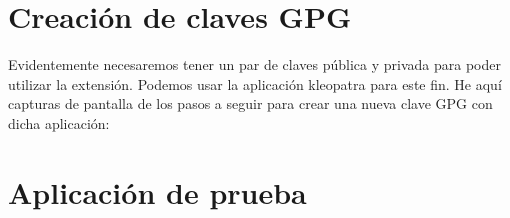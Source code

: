 \section{Creación de claves GPG}

Evidentemente necesaremos tener un par de claves pública y privada para poder utilizar la extensión. Podemos usar la aplicación kleopatra para este fin. He aquí capturas de pantalla de los pasos a seguir para crear una nueva clave GPG con dicha aplicación:


\section{Aplicación de prueba}

